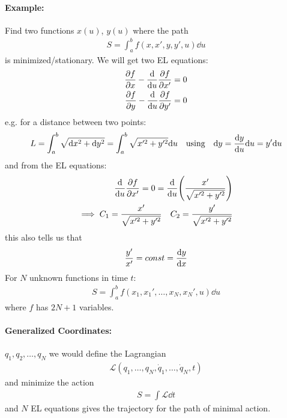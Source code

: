 \documentclass[../main.tex]{subfiles}
\begin{document}
\paragraph*{Example:} Find two functions $x(u)$, $y(u)$ where the path
\begin{align*}
    S = \int_a^b f(x, x', y, y', u) \dd u 
\end{align*}
is minimized/stationary. We will get two EL equations:
\begin{align*}
    \pdv{f}{x} - \dv{u} \pdv{f}{x'} &= 0 \\
    \pdv{f}{y} - \dv{u} \pdv{f}{y'} &= 0
\end{align*}
e.g. for a distance between two points:
\begin{align*}
    L = \int_a^b \sqrt{\dd x^2 + \dd y^2} = \int_a^b \sqrt{x'^2 + y'^2} \dd u
    \qusing \dd y = \dv{y}{u} \dd u = y' \dd u
\end{align*}
and from the EL equations:
\begin{align*}
    \dv{u} \pdv{f}{x'} = 0 = \dv{u}(\frac{x'}{\sqrt{x'^2 + y'^2}}) \\
    \implies C_1 = \frac{x'}{\sqrt{x'^2 + y'^2}} \quad C_2 = \frac{y'}{\sqrt{x'^2 + y'^2}}
\end{align*}
this also tells us that 
\begin{align*}
    \frac{y'}{x'} = const = \dv{y}{x}
\end{align*}
For $N$ unknown functions in time $t$:
\begin{align*}
    S = \int_a^b f(x_1, x_1', \dots, x_N, x_N', u) \dd u
\end{align*}
where $f$ has $2N + 1$ variables.

\paragraph*{Generalized Coordinates:} $q_1, q_2, \dots, q_N$ we would define the Lagrangian
\begin{align*}
    \mathcal{L} (q_1, \dots, q_N, \dot q_1, \dots, \dot q_N, t)
\end{align*}
and minimize the action
\begin{align*}
    S = \int \mathcal{L} \dd t
\end{align*}
and $N$ EL equations gives the trajectory for the path of minimal action.
\end{document}

